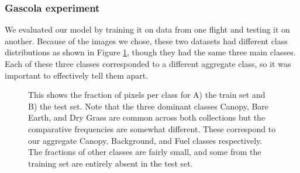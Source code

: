\subsubsection{Gascola experiment}
We evaluated our model by training it on data from one flight and testing it on another. Because of the images we chose, these two datasets had different class distributions as shown in Figure \ref{fig:results:semantic_class_fracs}, though they had the same three main classes. Each of these three classes corresponded to a different aggregate class, so it was important to effectively tell them apart. 


\begin{figure}[h!]
   \centering
   \caption{This shows the fraction of pixels per class for A) the train set and B) the test set. Note that the three dominant classes Canopy, Bare Earth, and Dry Grass are common across both collections but the comparative frequencies are somewhat different. These correspond to our aggregate Canopy, Background, and Fuel classes respectively. The fractions of other classes are fairly small, and some from the training set are entirely absent in the test set.}
   \label{fig:results:semantic_class_fracs}                %
\end{figure}

